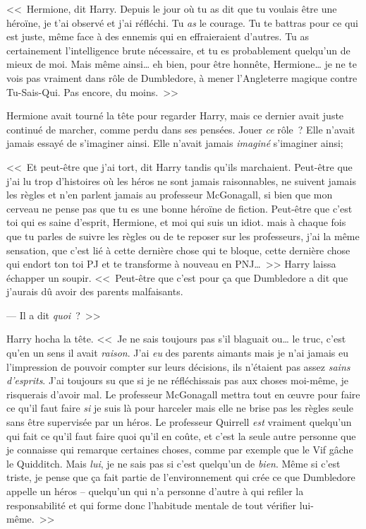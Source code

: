 <<~Hermione, dit Harry. Depuis le jour où tu as dit que tu voulais être une héroïne, je t'ai observé et j'ai réfléchi. Tu \emph{as} le courage. Tu te battras pour ce qui est juste, même face à des ennemis qui en effraieraient d'autres. Tu as certainement l'intelligence brute nécessaire, et tu es probablement quelqu'un de mieux de moi. Mais même ainsi… eh bien, pour être honnête, Hermione… je ne te vois pas vraiment dans rôle de Dumbledore, à mener l'Angleterre magique contre Tu-Sais-Qui. Pas encore, du moins.~>>

Hermione avait tourné la tête pour regarder Harry, mais ce dernier avait juste continué de marcher, comme perdu dans ses pensées. Jouer \emph{ce} rôle~? Elle n'avait jamais essayé de s'imaginer ainsi. Elle n'avait jamais \emph{imaginé} s'imaginer ainsi;

<<~Et peut-être que j'ai tort, dit Harry tandis qu'ils marchaient. Peut-être que j'ai lu trop d'histoires où les héros ne sont jamais raisonnables, ne suivent jamais les règles et n'en parlent jamais au professeur McGonagall, si bien que mon cerveau ne pense pas que tu es une bonne héroïne de fiction. Peut-être que c'est toi qui es saine d'esprit, Hermione, et moi qui suis un idiot. mais à chaque fois que tu parles de suivre les règles ou de te reposer sur les professeurs, j'ai la même sensation, que c'est lié à cette dernière chose qui te bloque, cette dernière chose qui endort ton toi PJ et te transforme à nouveau en PNJ…~>> Harry laissa échapper un soupir. <<~Peut-être que c'est pour ça que Dumbledore a dit que j'aurais dû avoir des parents malfaisants.

--- Il a dit \emph{quoi}~?~>>

Harry hocha la tête. <<~Je ne sais toujours pas s'il blaguait ou… le truc, c'est qu'en un sens il avait \emph{raison}. J'ai \emph{eu} des parents aimants mais je n'ai jamais eu l'impression de pouvoir compter sur leurs décisions, ils n'étaient pas assez \emph{sains d'esprits}. J'ai toujours su que si je ne réfléchissais pas aux choses moi-même, je risquerais d'avoir mal. Le professeur McGonagall mettra tout en œuvre pour faire ce qu'il faut faire \emph{si} je suis là pour harceler mais elle ne brise pas les règles seule sans être supervisée par un héros. Le professeur Quirrell \emph{est} vraiment quelqu'un qui fait ce qu'il faut faire quoi qu'il en coûte, et c'est la seule autre personne que je connaisse qui remarque certaines choses, comme par exemple que le Vif gâche le Quidditch. Mais \emph{lui}, je ne sais pas si c'est quelqu'un de \emph{bien}. Même si c'est triste, je pense que ça fait partie de l'environnement qui crée ce que Dumbledore appelle un héros -- quelqu'un qui n'a personne d'autre à qui refiler la responsabilité et qui forme donc l'habitude mentale de tout vérifier lui-même.~>>

